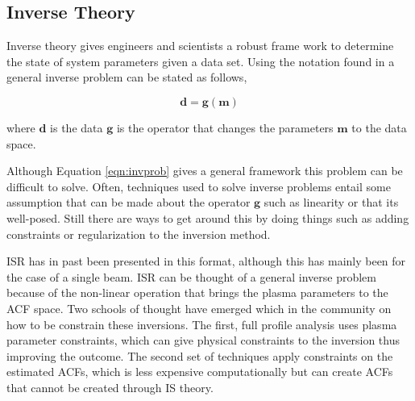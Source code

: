 

\subsection{Inverse Theory}
Inverse theory gives engineers and scientists a robust frame work to determine the state of system parameters given a data set. Using the notation found in \cite{menke2012geophysical} a general inverse problem can be stated as follows,

\begin{equation}
\label{eqn:invprob}
\mathbf{d}=\mathbf{g}(\mathbf{m})
\end{equation}

\noindent where $\mathbf{d}$ is the data $\mathbf{g}$ is the operator that changes the parameters $\mathbf{m}$ to the data space. 

Although Equation \ref{eqn:invprob} gives a general framework this problem can be difficult to solve. Often, techniques used to solve inverse problems entail some assumption that can be made about the operator $\mathbf{g}$ such as linearity or that its well-posed. Still there are ways to get around this by doing things such as adding constraints or regularization to the inversion method.

ISR has in past been presented in this format, although this has mainly been for the case of a single beam. ISR can be thought of a general inverse problem because of the non-linear operation that brings the plasma parameters to the ACF space. Two schools of thought have emerged which in the community on how to be constrain these inversions. The first, full profile analysis uses plasma parameter constraints, which can give physical constraints to the inversion thus improving the outcome. The second set of techniques apply constraints on the estimated ACFs, which is less expensive computationally but can create ACFs that cannot be created through IS theory.

